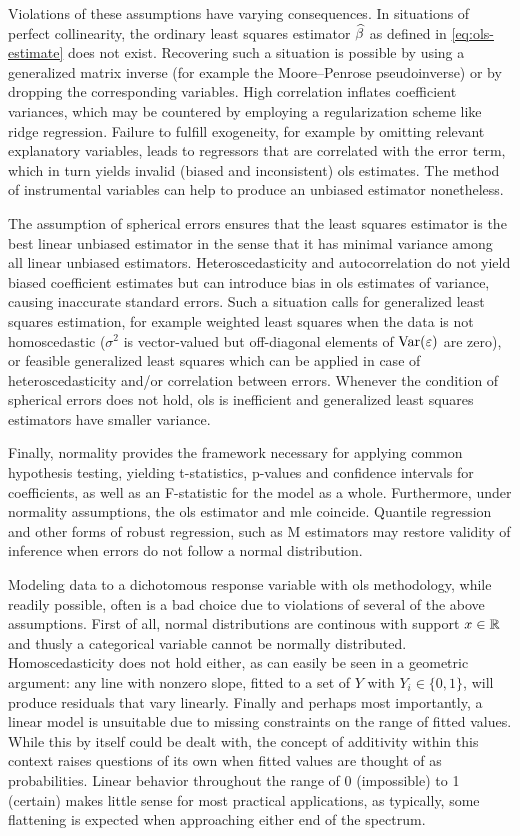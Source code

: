 Violations of these assumptions have varying consequences. In situations of perfect collinearity, the ordinary least squares estimator $\widehat{\beta}$ as defined in \eqref{eq:ols-estimate} does not exist. Recovering such a situation is possible by using a generalized matrix inverse (for example the Moore--Penrose pseudoinverse) or by dropping the corresponding variables. High correlation inflates coefficient variances, which may be countered by employing a regularization scheme like ridge regression. Failure to fulfill exogeneity, for example by omitting relevant explanatory variables, leads to regressors that are correlated with the error term, which in turn yields invalid (biased and inconsistent) \gls{ols} estimates. The method of instrumental variables can help to produce an unbiased estimator nonetheless.

The assumption of spherical errors ensures that the least squares estimator is the best linear unbiased estimator in the sense that it has minimal variance among all linear unbiased estimators. Heteroscedasticity and autocorrelation do not yield biased coefficient estimates but can introduce bias in \gls{ols} estimates of variance, causing inaccurate standard errors. Such a situation calls for generalized least squares estimation, for example weighted least squares when the data is not homoscedastic ($\sigma^2$ is vector-valued but off-diagonal elements of $\operatorname{Var}(\varepsilon)$ are zero), or feasible generalized least squares which can be applied in case of heteroscedasticity and\slash or correlation between errors. Whenever the condition of spherical errors does not hold, \gls{ols} is inefficient and generalized least squares estimators have smaller variance.

Finally, normality provides the framework necessary for applying common hypothesis testing, yielding t-statistics, p-values and confidence intervals for coefficients, as well as an F-statistic for the model as a whole. Furthermore, under normality assumptions, the \gls{ols} estimator and \gls{mle} coincide. Quantile regression and other forms of robust regression, such as M estimators may restore validity of inference when errors do not follow a normal distribution.

Modeling data to a dichotomous response variable with \gls{ols} methodology, while readily possible, often is a bad choice due to violations of several of the above assumptions. First of all, normal distributions are continous with support $x \in \mathbb{R}$ and thusly a categorical variable cannot be normally distributed. Homoscedasticity does not hold either, as can easily be seen in a geometric argument: any line with nonzero slope, fitted to a set of $Y$ with $Y_i \in \{0,1\}$, will produce residuals that vary linearly. Finally and perhaps most importantly, a linear model is unsuitable due to missing constraints on the range of fitted values. While this by itself could be dealt with, the concept of additivity within this context raises questions of its own when fitted values are thought of as probabilities. Linear behavior throughout the range of 0 (impossible) to 1 (certain) makes little sense for most practical applications, as typically, some flattening is expected when approaching either end of the spectrum.

